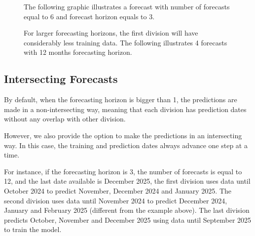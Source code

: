 \documentclass{article}
\numberwithin{equation}{section}
\begin{document}
\begin{figure}[H]
The following graphic illustrates a forecast with number of forecasts equal to 6 and forecast horizon equals to 3.

    \begin{center}
    \end{center}
\end{figure}

\begin{figure}[H]
For larger forecasting horizons, the first division will have considerably less training data. The following illustrates 4 forecasts with 12 months forecasting horizon.

    \begin{center}
    \end{center}
\end{figure}

\subsection{Intersecting Forecasts}

By default, when the forecasting horizon is bigger than 1, the predictions are made in a non-intersecting way, meaning that each division has prediction dates without any overlap with other division.

However, we also provide the option to make the predictions in an intersecting way. In this case, the training and prediction dates always advance one step at a time.

For instance, if the forecasting horizon is 3, the number of forecasts is equal to 12, and the last date available is December 2025, the first division uses data until October 2024 to predict November, December 2024 and January 2025. The second division uses data until November 2024 to predict December 2024, January and February 2025 (different from the example above). The last division predicts October, November and December 2025 using data until September 2025 to train the model.
\end{document}
